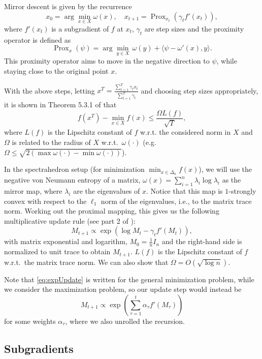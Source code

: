 \documentclass{article}
\DeclareMathOperator{\Prox}{Prox}
\begin{document}
Mirror descent is given by the recurrence
\[ x_0 = \arg\min_{x \in X} \omega(x), \quad x_{t+1} = \Prox_{x_t}(\gamma_t f'(x_t)), \]
where $f'(x_t)$ is a subgradient of $f$ at $x_t$, $\gamma_t$ are step sizes and the proximity operator is defined as 
\[ \Prox_{x}(\psi ) = \arg\min_{y \in X} \, \omega(y) + \langle \psi - \omega'(x), y \rangle. \]
This proximity operator aims to move in the negative direction to $\psi$, while staying close to the original point $x$.

With the above steps, letting $x^T = \frac{\sum_{t=1}^T \gamma_t x_t}{\sum_{t=1}^T \gamma_t}$ and choosing step sizes appropriately, it is shown in Theorem 5.3.1 of \cite{lectures} that
\[ f(x^T) - \min_{x \in X} f(x) \leq \frac{\Omega L(f)}{\sqrt{T}}, \]
where $L(f)$ is the Lipschitz constant of $f$ w.r.t. the considered norm in $X$ and $\Omega$ is related to the radius of $X$ w.r.t.\ $\omega(\cdot)$ (e.g.\ $\Omega \leq \sqrt{2 (\max \omega(\cdot) - \min \omega(\cdot))}$).


In the spectrahedron setup (for minimization $\min_{x \in \Delta_n} f(x)$), we will use the negative von Neumann entropy of a matrix, $\omega(x) = \sum_{i=1}^n \lambda_i \log \lambda_i$ as the mirror map, where $\lambda_i$ are the eigenvalues of $x$. Notice that this map is $1$-strongly convex with respect to the $\ell_1$ norm of the eigenvalues, i.e., to the matrix trace norm. Working out the proximal mapping, this gives us the following multiplicative update rule (see part 2 of \cite{blog}):
\begin{equation}\label{eq:expUpdate}
  M_{t+1} \propto \exp \left( \log M_t - \gamma_t f'(M_t) \right),
\end{equation}
with matrix exponential and logarithm, $M_0 = \frac{1}{n} I_n$ and the right-hand side is normalized to unit trace to obtain $M_{t+1}$. $L(f)$ is the Lipschitz constant of $f$ w.r.t.\ the matrix trace norm. We can also show that $\Omega = O(\sqrt{\log n})$. 

Note that \eqref{eq:expUpdate} is written for the general minimization problem, while we consider the maximization problem, so our update step would instead be
\[ M_{t+1} \propto \exp \left( \sum_{\tau=1}^t \alpha_\tau f'(M_\tau) \right) \]
for some weights $\alpha_\tau$, where we also unrolled the recursion.


\subsection*{Subgradients}
\end{document}
